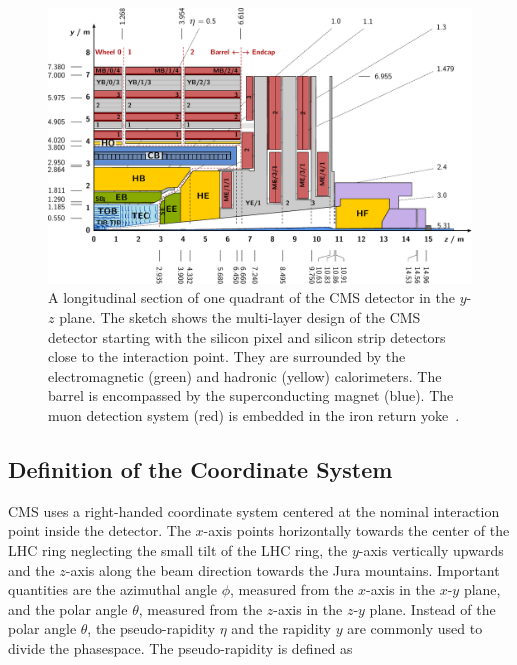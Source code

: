 \begin{figure}[htp]
    \centering
    \includegraphics[width=1.0\textwidth]{figures/experimental_setup/cms_longitudinal_section.pdf}
    \caption[Longitudinal section of the CMS
    detector]{A longitudinal section of one quadrant of the CMS
        detector in the $y$-$z$ plane. The sketch shows
    the multi-layer design of the CMS detector starting with the silicon pixel
and silicon strip detectors close to the interaction point. They are surrounded
by the electromagnetic (green) and hadronic (yellow) calorimeters. The barrel is
encompassed by the superconducting magnet (blue). The muon detection system
(red) is embedded in the iron return yoke~\cite{Berger:2014aca}.}
    \label{fig:cms:longitudinal_section}
\end{figure}

\subsection{Definition of the Coordinate System}
\label{sec:coord_system}

CMS uses a right-handed coordinate system centered at the nominal interaction
point inside the detector. The $x$-axis points horizontally towards the center
of the LHC ring neglecting the small tilt of the LHC ring, the $y$-axis
vertically upwards and the $z$-axis along the beam direction towards the Jura
mountains. Important quantities are the azimuthal angle $\phi$, measured from
the $x$-axis in the $x$-$y$ plane, and the polar angle $\theta$, measured from
the $z$-axis in the $z$-$y$ plane. Instead of the polar angle $\theta$, the
pseudo-rapidity $\eta$ and the rapidity $y$ are commonly used to divide the
phasespace. The pseudo-rapidity is defined as

